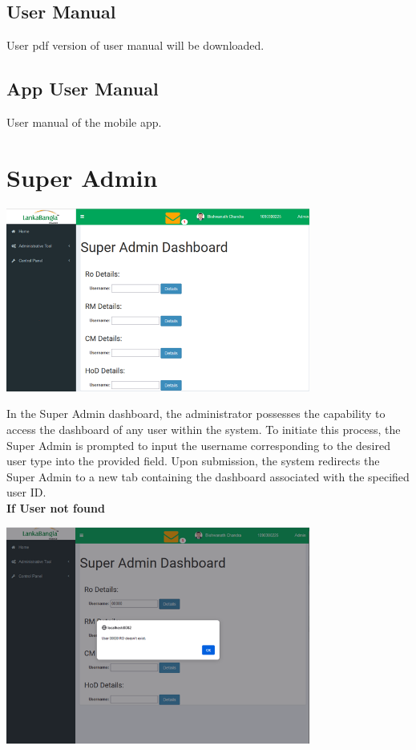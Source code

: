 \documentclass{article}
\begin{document}
\subsection{User Manual}
User pdf version of user manual will be downloaded. 

\subsection{App User Manual}
User manual of the mobile app.




\section{Super Admin}
\begin{center}
\includegraphics[width=0.75\textwidth]{image/super_admin.png}
\end{center}
In the Super Admin dashboard, the administrator possesses the capability to access the dashboard of any user within the system. To initiate this process, the Super Admin is prompted to input the username corresponding to the desired user type into the provided field. Upon submission, the system redirects the Super Admin to a new tab containing the dashboard associated with the specified user ID.\\

\textbf{If User not found}
\begin{center}
\includegraphics[width=0.75\textwidth]{image/super_admin_user_not_found.png}
\end{center}
\end{document}
